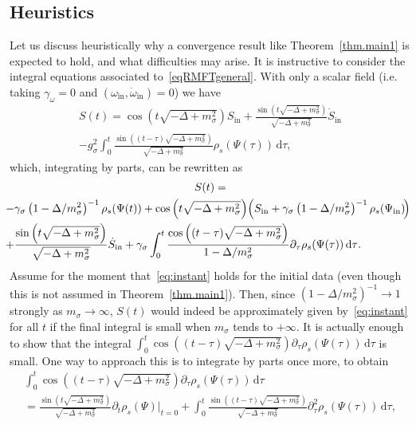 \documentclass[AHL,Unicode,longabstracts,published]{cedram}
\newcommand{\rmin}{\mathrm{in}}
\renewcommand\d[1]{{\ensuremath{\,\text{d}#1}}}
\begin{document}
\subsection{Heuristics}\label{sec:heuristics}

Let us discuss heuristically why a convergence result like Theorem~\ref{thm.main1} is expected to hold, and what difficulties may arise. It is instructive to consider the integral equations associated to~\eqref{eqRMFTgeneral}. With only a scalar field (i.e. taking $\gamma_\omega = 0$ and $(\omega_\rmin,\dot\omega_\rmin)=0$) we have
\begin{multline}
S(t)=\cos \left(t\sqrt{-\Delta+m_\sigma^2}\right)S_\rmin+\frac{\sin \left(t\sqrt{-\Delta+m_\sigma^2}\right)}{\sqrt{-\Delta+m_\sigma^2}}\dot{S}_\rmin\\
 -g_\sigma^2\int_0^t\frac{\sin\left((t-\tau)\sqrt{-\Delta+m_\sigma^2}\right)}{\sqrt{-\Delta+m_\sigma^2}}\rho_s(\Psi(\tau))\d \tau,
\end{multline}
which, integrating by parts, can be rewritten as
\begin{multline*}
S(t)=\\
\mkern-8mu{\begin{aligned}
-&\gamma_\sigma\left(1-\Delta/m_\sigma^2\right)^{-1}\rho_s(\Psi(t))+\cos \left(t\sqrt{-\Delta+m_\sigma^2}\right)\!\left(S_\rmin+\gamma_\sigma\left(1-\Delta/m_\sigma^2\right)^{-1}\rho_s(\Psi_\rmin)\!\right)\\
+&\frac{\sin \left(t\sqrt{-\Delta+m_\sigma^2}\right)}{\sqrt{-\Delta+m_\sigma^2}}\dot{S}_\rmin +\gamma_\sigma\int_0^t\frac{\cos \left((t-\tau)\sqrt{-\Delta+m_\sigma^2}\right)}{1-\Delta/m_\sigma^2}\partial_\tau\rho_s(\Psi(\tau))\d \tau.
\end{aligned}}
\end{multline*}
Assume for the moment that~\eqref{eq:instant} holds for the initial data (even though this is not assumed in Theorem~\ref{thm.main1}). Then, since $(1-\Delta/m_\sigma^2)^{-1}\to 1$ strongly as $m_\sigma\to \infty$, $S(t)$ would indeed be approximately given by~\eqref{eq:instant} for all $t$ if the final integral is small when $m_\sigma$ tends to $+\infty$. It is actually enough to show that the integral $\int_0^t\cos ((t-\tau)\sqrt{-\Delta+m_\sigma^2})\partial_\tau\rho_s(\Psi(\tau))\d \tau$ is small. One way to approach this is to integrate by parts once more, to obtain
\begin{multline}
\int_0^t\cos \left((t-\tau)\sqrt{-\Delta+m_\sigma^2}\right)\partial_\tau\rho_s(\Psi(\tau))\d \tau\\ =\frac{\sin\left(t\sqrt{-\Delta+m_\sigma^2}\right)}{\sqrt{-\Delta+m_\sigma^2}}\partial_t\rho_s(\Psi)\vert_{t=0}
+\int_0^t\frac{\sin \left((t-\tau)\sqrt{-\Delta+m_\sigma^2}\right)}{\sqrt{-\Delta+m_\sigma^2}}\partial_\tau^2\rho_s(\Psi(\tau))\d \tau,
\end{multline}
\end{document}
